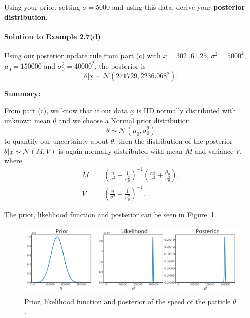 {\begin{itemize}
Using your prior, setting $\sigma = 5000$ and using this data, derive your \textbf{\color{darkblue}posterior distribution}.
\end{itemize}
\paragraph{Solution to Example 2.7(d)}{
    
    Using our posterior update rule from part (c) with $\bar{x} = 302161.25$, $\sigma^2 = 5000^2$, $\mu_0 = 150000$ and $\sigma_0^2 = 40000^2$, the posterior is
    $$ \theta | \underline{x} \sim \mathcal{N}(271729, 2236.068^2).$$
    
}

\textbf{Summary:}

From part (c), we know that if our data $\underline{x}$ is IID normally distributed with unknown mean $\theta$ and we choose a Normal prior distribution 
$$\theta \sim \mathcal{N}(\mu_0,\sigma^2_0)$$
to quantify our uncertainty about $\theta$, then the distribution of the posterior $\theta|\underline{x}\sim \mathcal{N}(M, V)$ is again normally distributed with mean $M$ and variance $V$, where
\begin{align*}
    M &= \left(\frac{n}{\sigma^2} + \frac{1}{\sigma_0^2}\right)^{-1}\left(\frac{n\bar{x}}{\sigma^2} + \frac{\mu_0}{\sigma_0^2}\right), \\
    V &= \left(\frac{n}{\sigma^2} + \frac{1}{\sigma_0^2}\right)^{-1}.
\end{align*}

The prior, likelihood function and posterior can be seen in Figure~\ref{fig:speed}.

\begin{figure}[h] 

\includegraphics{images/speed_priorposterior.svg}
\caption{Prior, likelihood function and posterior of the speed of the particle $\theta$.}

\label{fig:speed}
\end{figure}}

\clearpage
